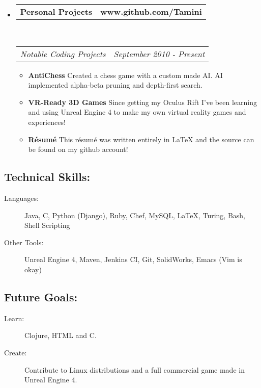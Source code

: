 \documentclass[11pt]{article} %
\makeatletter
\newcommand{\CPP}
{C\nolinebreak[4]\hspace{-.05em}\raisebox{.22ex}{\footnotesize\bf ++}}
\newcommand{\headerrow}[2]
{\begin{tabular*}{\linewidth}{l@{\extracolsep{\fill}}r}
	#1 &
	#2 \\
\end{tabular*}}
\makeatother
\begin{document}
\begin{itemize}
\begin{itemize}
	\end{itemize}
	\item
	\headerrow
		{\textbf{Personal Projects}}
		{\textbf{www.github.com/Tamini}}
	\\
	\headerrow
		{\emph{Notable Coding Projects}}
		{\emph{September 2010 - Present}}
	\begin{itemize}
		\item {\bf AntiChess} Created a chess game with a custom made AI. AI implemented alpha-beta pruning and depth-first search.
		\item {\bf VR-Ready 3D Games} Since getting my Oculus Rift I've been learning and using Unreal Engine 4 to make my own virtual reality games and experiences!
		\item {\bf R\'{e}sum\'{e}} This r\'{e}sum\'{e} was written entirely in LaTeX and the source can be found on my github account!
	\end{itemize}

\end{itemize}
\subsection*{Technical Skills:}
\begin{description}
	\item[Languages:] Java, \CPP, Python (Django), Ruby, Chef, MySQL, \LaTeX, Turing, Bash, Shell Scripting
	\item[Other Tools:] Unreal Engine 4, Maven, Jenkins CI, Git, SolidWorks, Emacs (Vim is okay)
\end{description}
\subsection*{Future Goals:}
\begin{description}
	\item[Learn:] Clojure, HTML and C.
	\item[Create:] Contribute to Linux distributions and a full commercial game made in Unreal Engine 4.
\end{description}
\end{document}
